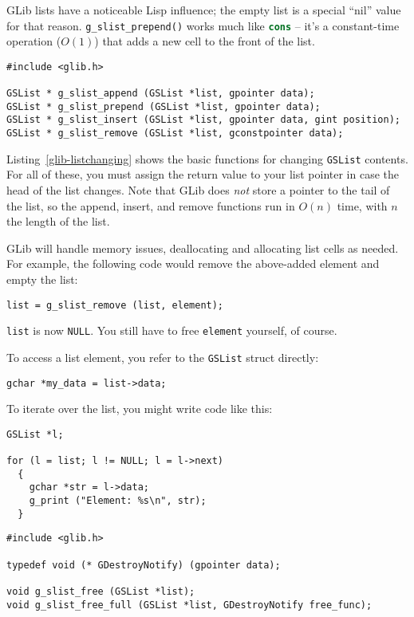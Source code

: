 GLib lists have a noticeable Lisp influence; the empty list is a special ``nil'' value for that reason. \lstinline{g_slist_prepend()} works much like \lstinline[language=Lisp]{cons} -- it's a constant-time operation ($O(1)$) that adds a new cell to the front of the list.

\begin{lstlisting}[float, caption={Changing linked list contents}, label=glib-listchanging]
#include <glib.h>

GSList * g_slist_append (GSList *list, gpointer data);
GSList * g_slist_prepend (GSList *list, gpointer data);
GSList * g_slist_insert (GSList *list, gpointer data, gint position);
GSList * g_slist_remove (GSList *list, gconstpointer data);
\end{lstlisting}

Listing~\ref{glib-listchanging} shows the basic functions for changing \lstinline{GSList} contents. For all of these, you must assign the return value to your list pointer in case the head of the list changes. Note that GLib does \emph{not} store a pointer to the tail of the list, so the append, insert, and remove functions run in $O(n)$ time, with $n$ the length of the list.

GLib will handle memory issues, deallocating and allocating list cells as needed. For example, the following code would remove the above-added element and empty the list:
\begin{lstlisting}
list = g_slist_remove (list, element);
\end{lstlisting}

\lstinline{list} is now \lstinline{NULL}. You still have to free \lstinline{element} yourself, of course.

To access a list element, you refer to the \lstinline{GSList} struct directly:
\begin{lstlisting}
gchar *my_data = list->data;
\end{lstlisting}

To iterate over the list, you might write code like this:
\begin{lstlisting}
GSList *l;

for (l = list; l != NULL; l = l->next)
  {
    gchar *str = l->data;
    g_print ("Element: %s\n", str);
  }
\end{lstlisting}

\begin{lstlisting}[float, caption={Freeing entire linked lists}, label=glib-listfree]
#include <glib.h>

typedef void (* GDestroyNotify) (gpointer data);

void g_slist_free (GSList *list);
void g_slist_free_full (GSList *list, GDestroyNotify free_func);
\end{lstlisting}

